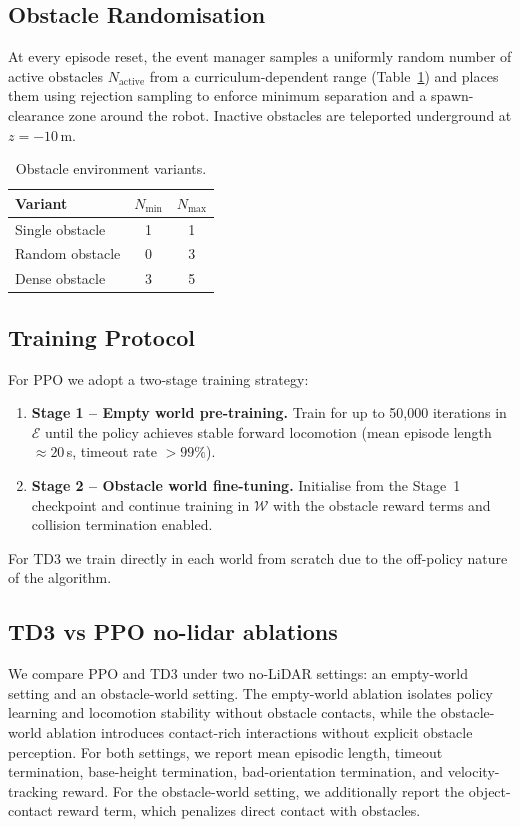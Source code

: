 \documentclass{article}
\begin{document}
\subsection{Obstacle Randomisation}

At every episode reset, the event manager samples a uniformly random number of
active obstacles $N_\text{active}$ from a curriculum-dependent range
(Table~\ref{tab:curricula}) and places them using rejection sampling to
enforce minimum separation and a spawn-clearance zone around the robot.
Inactive obstacles are teleported underground at $z = -10$\,m.

\begin{table}[h]
  \centering
  \caption{Obstacle environment variants.}
  \label{tab:curricula}
  \begin{tabular}{lcc}
    \toprule
    \textbf{Variant} & $N_\text{min}$ & $N_\text{max}$ \\
    \midrule
    Single obstacle & 1 & 1 \\
    Random obstacle & 0 & 3 \\
    Dense obstacle  & 3 & 5 \\
    \bottomrule
  \end{tabular}
\end{table}

\subsection{Training Protocol}

For PPO we adopt a two-stage training strategy:
\begin{enumerate}
  \item \textbf{Stage 1 – Empty world pre-training.} Train for up to 50{,}000
        iterations in $\mathcal{E}$ until the policy achieves stable
        forward locomotion (mean episode length $\approx 20$\,s, timeout
        rate $> 99\%$).
  \item \textbf{Stage 2 – Obstacle world fine-tuning.} Initialise from the
        Stage~1 checkpoint and continue training in $\mathcal{W}$ with the
        obstacle reward terms and collision termination enabled.
\end{enumerate}
For TD3 we train directly in each world from scratch due to the off-policy
nature of the algorithm.

\subsection{TD3 vs PPO no-lidar ablations}
    We compare PPO and TD3 under two no-LiDAR settings: an empty-world setting and an obstacle-world
  setting.
  The empty-world ablation isolates policy learning and locomotion stability without obstacle
  contacts, while the obstacle-world ablation introduces contact-rich interactions without explicit
  obstacle perception.
  For both settings, we report mean episodic length, timeout termination, base-height termination,
  bad-orientation termination, and velocity-tracking reward.
  For the obstacle-world setting, we additionally report the object-contact reward term, which
  penalizes direct contact with obstacles.
\end{document}
